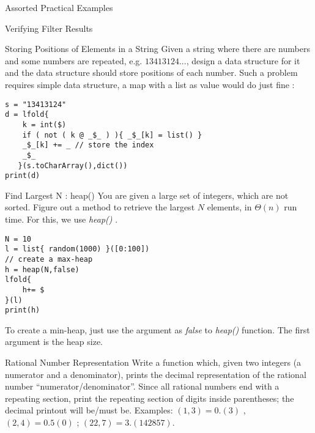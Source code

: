 \begin{section}{Assorted Practical Examples}
\begin{subsection}{Verifying Filter Results}
\end{subsection}

\begin{subsection}{Storing Positions of Elements in a String}
Given a string where there are numbers and some numbers are repeated, e.g. $13413124...$, 
design a data structure for it and the data structure should store positions of each number.
Such a problem requires simple data structure, a map with a list as value would do just fine :

\begin{center}\begin{minipage}{\linewidth}
\begin{lstlisting}[style=JexlStyle]
s = "13413124"
d = lfold{
    k = int($)
    if ( not ( k @ _$_ ) ){ _$_[k] = list() }
    _$_[k] += _ // store the index 
    _$_ 
   }(s.toCharArray(),dict())
print(d)
\end{lstlisting}  
\end{minipage}\end{center}

\end{subsection}


\begin{subsection}{Find Largest N : heap() }
You are given a large set of integers, which are not sorted. 
Figure out a method to retrieve the largest $N$ elements, in $\Theta(n)$ run time.
For this, we use \emph{heap()} .

\begin{center}\begin{minipage}{\linewidth}
\begin{lstlisting}[style=JexlStyle]
N = 10 
l = list{ random(1000) }([0:100])
// create a max-heap
h = heap(N,false)
lfold{
    h+= $
}(l)
print(h)
\end{lstlisting}  
\end{minipage}\end{center}
To create a min-heap, just use the argument as \emph{false} to \emph{heap()} function.
The first argument is the heap size.
\end{subsection}


\begin{subsection}{Rational Number Representation}
Write a function which, given two integers (a numerator and a denominator), 
prints the decimal representation of the rational number ``numerator/denominator''. 
Since all rational numbers end with a repeating section, print the repeating section of digits inside parentheses; 
the decimal printout will be/must be. 
Examples: $(1 , 3) = 0.(3)$  , $(2 , 4) = 0.5(0)$ ; $(22, 7) = 3.(142857)$. 


\end{subsection}
\end{section}
